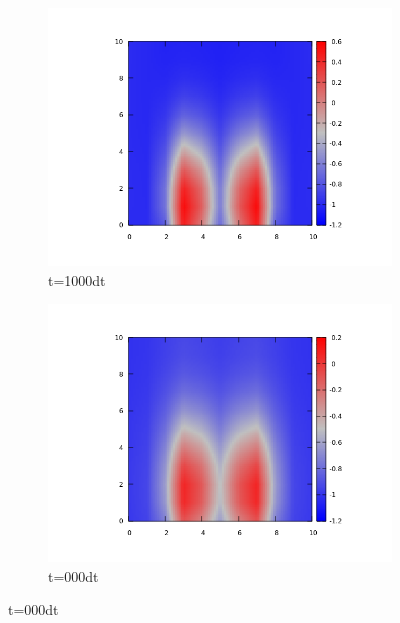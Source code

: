 \documentclass{article}
\begin{document}
\vfill



\clearpage
\newpage

\vfill
\begin{figure}
\centering
\begin{subfigure}{.5\textwidth}
  \centering
  \includegraphics[width=1.0\linewidth]{1000contact3p4.png}
  \caption{t=1000dt}
  \label{fig:sub1}
\end{subfigure}%
\begin{subfigure}{.5\textwidth}
  \centering
  \includegraphics[width=1.0\linewidth]{3000contact3p4.png}
  \caption{t=000dt}
  \label{fig:sub2}
\end{subfigure}
\label{fig:test}
\end{figure}
\end{document}
